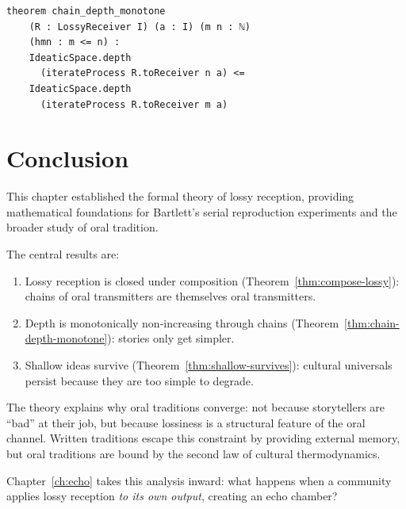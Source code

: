 \begin{lstlisting}[caption={Chain depth monotonicity in Lean~4.}]
theorem chain_depth_monotone
    (R : LossyReceiver I) (a : I) (m n : ℕ)
    (hmn : m <= n) :
    IdeaticSpace.depth
      (iterateProcess R.toReceiver n a) <=
    IdeaticSpace.depth
      (iterateProcess R.toReceiver m a)
\end{lstlisting}


\section{Conclusion}
\label{sec:lossy-conclusion}

This chapter established the formal theory of lossy reception, providing
mathematical foundations for Bartlett's serial reproduction experiments and
the broader study of oral tradition.

The central results are:
\begin{enumerate}
  \item Lossy reception is closed under composition
    (Theorem~\ref{thm:compose-lossy}): chains of oral transmitters are
    themselves oral transmitters.
  \item Depth is monotonically non-increasing through chains
    (Theorem~\ref{thm:chain-depth-monotone}): stories only get simpler.
  \item Shallow ideas survive (Theorem~\ref{thm:shallow-survives}):
    cultural universals persist because they are too simple to degrade.
\end{enumerate}

The theory explains why oral traditions converge: not because storytellers
are ``bad'' at their job, but because lossiness is a structural feature of
the oral channel.  Written traditions escape this constraint by providing
external memory, but oral traditions are bound by the second law of cultural
thermodynamics.

Chapter~\ref{ch:echo} takes this analysis inward: what happens when a
community applies lossy reception \emph{to its own output}, creating an echo
chamber?
